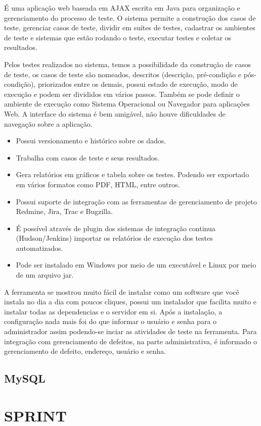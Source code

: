 \documentclass{abnt}
\begin{document}
			É uma aplicação web baseada em AJAX escrita em Java para organização e gerenciamento do processo de teste. O sistema
			permite a construção dos casos de teste, gerenciar casos de teste, dividir em suítes de testes, cadastrar os
			ambientes de teste e sistemas que estão rodando o teste, executar testes e coletar os resultados.
			
			Pelos testes realizados no sistema, temos a possibilidade da construção de casos de teste, os casos de teste são
			nomeados, descritos (descrição, pré-condição e pós-condição), priorizados entre os demais, possui estado de
			execução, modo de execução e podem ser divididos em vários passos. Também se pode definir o ambiente de execução
			como Sistema Operacional ou Navegador para aplicações Web. A interface do sistema é bem amigável, não houve
			dificuldades de navegação sobre a aplicação.
			
			\begin{itemize}
			  \item Possui versionamento e histórico sobre os dados.
			  \item Trabalha com casos de teste e seus resultados.
			  \item Gera relatórios em gráficos e tabela sobre os testes. Podendo ser exportado em vários formatos como PDF,
			  HTML, entre outros.
			  \item Possui suporte de integração com as ferramentas de gerenciamento de projeto Redmine, Jira, Trac e Bugzilla.
			  \item É possível através de plugin dos sistemas de integração continua (Hudson/Jenkins) importar os relatórios de
			  execução dos testes automatizados.
			  \item Pode ser instalado em Windows por meio de um executável e Linux por meio de um arquivo jar.
			\end{itemize}
			
			A ferramenta se mostrou muito fácil de instalar como um software que você instala no dia a dia com poucos cliques,
			possui um instalador que facilita muito e instalar todas as dependencias e o servidor em si. Após a instalação, a
			configuração nada mais foi do que informar o usuário e senha para o administrador assim podendo-se inciar as
			atividades de teste na ferramenta. Para integração com gerenciamento de defeitos, na parte administrativa, é
			informado o gerenciamento de defeito, endereço, usuário e senha. 
			
			
	\section{MySQL}
	\blindtext
	

\clearpage
\chapter{SPRINT}
	
	\blindtext

\clearpage
\nocite{*}

%		
		
\end{document}
